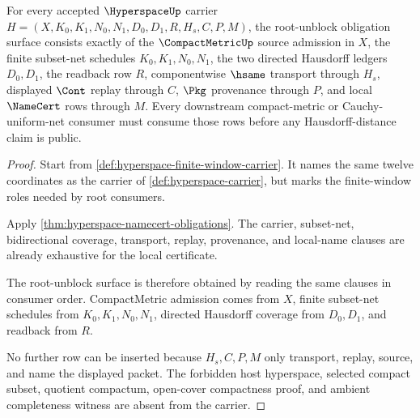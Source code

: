 \begin{theorem}
\label{thm:hyperspace-namecert-obligation-surface}
For every accepted $\HyperspaceUp$ carrier $H=(X,K_0,K_1,N_0,N_1,D_0,D_1,R,H_s,C,P,M)$, the root-unblock obligation surface consists exactly of the $\CompactMetricUp$ source admission in $X$, the finite subset-net schedules $K_0,K_1,N_0,N_1$, the two directed Hausdorff ledgers $D_0,D_1$, the readback row $R$, componentwise $\hsame$ transport through $H_s$, displayed $\Cont$ replay through $C$, $\Pkg$ provenance through $P$, and local $\NameCert$ rows through $M$. Every downstream compact-metric or Cauchy-uniform-net consumer must consume those rows before any Hausdorff-distance claim is public.
\end{theorem}
\begin{proof}
Start from \autoref{def:hyperspace-finite-window-carrier}. It names the same twelve coordinates as the carrier of \autoref{def:hyperspace-carrier}, but marks the finite-window roles needed by root consumers.

Apply \autoref{thm:hyperspace-namecert-obligations}. The carrier, subset-net, bidirectional coverage, transport, replay, provenance, and local-name clauses are already exhaustive for the local certificate.

The root-unblock surface is therefore obtained by reading the same clauses in consumer order. CompactMetric admission comes from $X$, finite subset-net schedules from $K_0,K_1,N_0,N_1$, directed Hausdorff coverage from $D_0,D_1$, and readback from $R$.

No further row can be inserted because $H_s,C,P,M$ only transport, replay, source, and name the displayed packet. The forbidden host hyperspace, selected compact subset, quotient compactum, open-cover compactness proof, and ambient completeness witness are absent from the carrier.
\end{proof}

